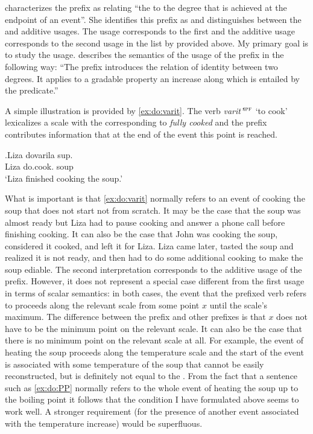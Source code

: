 \citet[70]{Kagan:book} characterizes the prefix  as relating ``the  to the degree that is achieved at the endpoint of an event''. She identifies this prefix as  and distinguishes between the  and additive  usages. The  usage corresponds to the first and the additive usage corresponds to the second usage in the list by \citet{Shvedova:82} provided above. My primary goal is to study the  usage. \citet[72]{Kagan:book} describes the semantics of the  usage of the prefix  in the following way: ``The prefix introduces the relation of identity between two degrees. It applies to a gradable property an increase along which is entailed by the predicate.''

A simple illustration is provided by \ref{ex:do:varit}. The verb \textit{varit'}$^{\textsc{ipf}}$ `to cook' lexicalizes a scale with the  corresponding to \textit{fully cooked} and the prefix  contributes information that at the end of the event this point is reached. 

\exg.\label{ex:do:varit}Liza dovarila sup.\\
Liza do.cook. soup\\
\trans `Liza finished cooking the soup.'

What is important is that \ref{ex:do:varit} normally refers to an event of cooking the soup that does not start not from scratch. It may be the case that the soup was almost ready but Liza had to pause cooking and answer a phone call before finishing cooking. It can also be the case that John was cooking the soup, considered it cooked, and left it for Liza. Liza came later, tasted the soup and realized it is not ready, and then had to do some additional cooking to make the soup ediable. The second interpretation corresponds to the additive usage of the prefix. However, it does not represent a special case different from the first usage in terms of scalar semantics: in both cases, the event that the prefixed verb refers to proceeds along the relevant scale from some point $x$ until the scale's maximum. The difference between the prefix  and other prefixes is that $x$ does not have to be the minimum point on the relevant scale. It can also be the case that there is no minimum point on the relevant scale at all. For example, the event of heating the soup proceeds along the temperature scale and the start of the event is associated with some temperature of the soup that cannot be easily reconstructed, but is definitely not equal to the . From the fact that a sentence such as \ref{ex:do:PP} normally refers to the whole event of heating the soup up to the boiling point it follows that the condition I have formulated above seems to work well. A stronger requirement (for the presence of another event associated with the temperature increase) would be superfluous.

